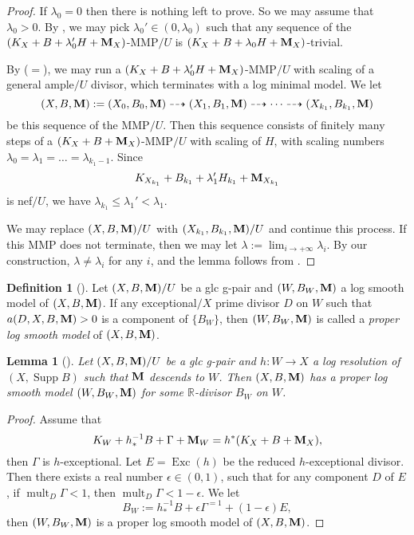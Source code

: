 \documentclass[11pt]{amsart}
\numberwithin{equation}{section}
\newcommand{\Mm}{{\bf{M}}}
\newcommand{\Rr}{\mathbb{R}}
\newcommand{\Exc}{\operatorname{Exc}}
\newcommand{\Supp}{\operatorname{Supp}}
\newcommand{\mult}{\operatorname{mult}}
\newtheorem{lem}[thm]{Lemma}
\theoremstyle{definition}
\newtheorem{defn}[thm]{Definition}
\theoremstyle{definition}
\theoremstyle{definition}
\begin{document}
\begin{proof}
If $\lambda_0=0$ then there is nothing left to prove. So we may assume that $\lambda_0>0$. By \cite[Lemma 3.17]{HL18}, we may pick $\lambda_0'\in (0,\lambda_0)$ such that any sequence of the $(K_X+B+\lambda_0'H+\Mm_X)$-MMP$/U$ is $(K_X+B+\lambda_0H+\Mm_X)$-trivial. 

By \cite[Theorem 2.8]{HL21} ($=$\cite[Version 3, Theorem 2.24]{HL21}), we may run a $(K_X+B+\lambda_0'H+\Mm_X)$-MMP$/U$ with scaling of a general ample$/U$ divisor, which terminates with a log minimal model. We let
$$(X,B,\Mm):=(X_0,B_0,\Mm)\dashrightarrow (X_1,B_1,\Mm)\dashrightarrow\dots\dashrightarrow (X_{k_1},B_{k_1},\Mm)$$
be this sequence of the MMP$/U$. Then this sequence consists of finitely many steps of a $(K_X+B+\Mm_X)$-MMP$/U$ with scaling of $H$, with scaling numbers $\lambda_0=\lambda_1=\dots=\lambda_{k_1-1}$. Since
$$K_{X_{k_1}}+B_{k_1}+\lambda'_1H_{k_1}+\Mm_{X_{k_1}}$$
is nef$/U$, we have $\lambda_{k_1}\leq\lambda_1'<\lambda_1$. 

We may replace $(X,B,\Mm)/U$ with $(X_{k_1},B_{k_1},\Mm)/U$ and continue this process. If this MMP does not terminate, then we may let $\lambda:=\lim_{i\rightarrow+\infty}\lambda_i$. By our construction, $\lambda\not=\lambda_i$ for any $i$, and the lemma follows from \cite[Remark 3.21, Theorem 4.1]{HL18}. 
\end{proof}


\begin{defn}[{\cite[Version 3, Definition 3.1]{HL21}}]\label{defn: log smooth models}
Let $(X,B,\Mm)/U$ be a glc g-pair and $(W,B_W,\Mm)$ a log smooth model of $(X,B,\Mm)$. If any exceptional$/X$ prime divisor $D$ on $W$ such that $a(D,X,B,\Mm)>0$ is a component of $\{B_W\}$, then  $(W,B_W,\Mm)$ is called a \emph{proper log smooth model} of $(X,B,\Mm)$.
\end{defn}


\begin{lem}[{\cite[Version 3, Lemma 3.6]{HL21}}]\label{lem: existence of proper log smooth model}
Let $(X,B,\Mm)/U$ be a glc g-pair and $h: W\rightarrow X$ a log resolution of $(X,\Supp B)$ such that $\Mm$ descends to $W$. Then $(X,B,\Mm)$ has a proper log smooth model $(W,B_W,\Mm)$ for some $\Rr$-divisor $B_W$ on $W$.
\end{lem}
\begin{proof}
Assume that
$$K_W+h^{-1}_*B+\Gamma+\Mm_W=h^*(K_X+B+\Mm_X),$$
then $\Gamma$ is $h$-exceptional. Let $E=\Exc(h)$ be the reduced $h$-exceptional divisor. Then there exists a real number $\epsilon\in (0,1)$, such that for any component $D$ of $E$, if $\mult_D\Gamma<1$, then $\mult_D\Gamma<1-\epsilon$. We let $$B_W:=h^{-1}_*B+\epsilon\Gamma^{=1}+(1-\epsilon)E,$$
then $(W,B_W,\Mm)$ is a proper log smooth model of $(X,B,\Mm)$.
\end{proof}
\end{document}
